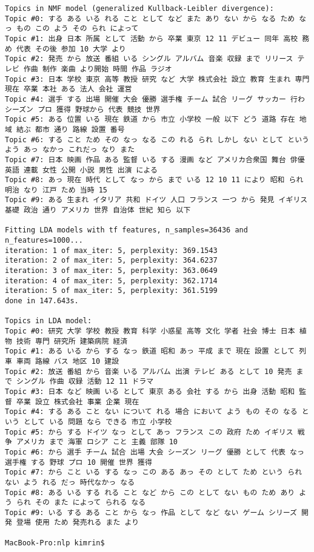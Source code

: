 \documentclass[uplatex]{jsarticle}
\begin{document}
\begin{verbatim}
Topics in NMF model (generalized Kullback-Leibler divergence):
Topic #0: する ある いる れる こと として など また あり ない から なる ため なっ もの この よう その られ によって
Topic #1: 出身 日本 所属 として 活動 から 卒業 東京 12 11 デビュー 同年 高校 務め 代表 その後 参加 10 大学 より
Topic #2: 発売 から 放送 番組 いる シングル アルバム 音楽 収録 まで リリース テレビ 作曲 制作 楽曲 より開始 時間 作品 ラジオ
Topic #3: 日本 学校 東京 高等 教授 研究 など 大学 株式会社 設立 教育 生まれ 専門 現在 卒業 本社 ある 法人 会社 運営
Topic #4: 選手 する 出場 開催 大会 優勝 選手権 チーム 試合 リーグ サッカー 行わ シーズン プロ 獲得 野球から 代表 競技 世界
Topic #5: ある 位置 いる 現在 鉄道 から 市立 小学校 一般 以下 どう 道路 存在 地域 結ぶ 都市 通り 路線 設置 番号
Topic #6: する こと ため その なっ なる この れる られ しかし ない として という よう あっ なかっ これだっ なり また
Topic #7: 日本 映画 作品 ある 監督 いる する 漫画 など アメリカ合衆国 舞台 俳優 英語 連載 女性 公開 小説 男性 出演 による
Topic #8: あっ 現在 時代 として なっ から まで いる 12 10 11 により 昭和 られ 明治 なり 江戸 ため 当時 15
Topic #9: ある 生まれ イタリア 共和 ドイツ 人口 フランス 一つ から 発見 イギリス 基礎 政治 通り アメリカ 世界 自治体 世紀 知ら 以下

Fitting LDA models with tf features, n_samples=36436 and n_features=1000...
iteration: 1 of max_iter: 5, perplexity: 369.1543
iteration: 2 of max_iter: 5, perplexity: 364.6237
iteration: 3 of max_iter: 5, perplexity: 363.0649
iteration: 4 of max_iter: 5, perplexity: 362.1714
iteration: 5 of max_iter: 5, perplexity: 361.5199
done in 147.643s.

Topics in LDA model:
Topic #0: 研究 大学 学校 教授 教育 科学 小惑星 高等 文化 学者 社会 博士 日本 植物 技術 専門 研究所 建築病院 経済
Topic #1: ある いる から する なっ 鉄道 昭和 あっ 平成 まで 現在 設置 として 列車 車両 路線 バス 地区 10 建設
Topic #2: 放送 番組 から 音楽 いる アルバム 出演 テレビ ある として 10 発売 まで シングル 作曲 収録 活動 12 11 ドラマ
Topic #3: 日本 など 映画 いる として 東京 ある 会社 する から 出身 活動 昭和 監督 卒業 設立 株式会社 事業 企業 現在
Topic #4: する ある こと ない について れる 場合 において よう もの その なる という として いる 問題 なら できる 市立 小学校
Topic #5: から する ドイツ なっ として あっ フランス この 政府 ため イギリス 戦争 アメリカ まで 海軍 ロシア こと 主義 部隊 10
Topic #6: から 選手 チーム 試合 出場 大会 シーズン リーグ 優勝 として 代表 なっ 選手権 する 野球 プロ 10 開催 世界 獲得
Topic #7: から こと いる する なっ この ある あっ その として ため という られ ない よう れる だっ 時代なかっ なる
Topic #8: ある いる する れる こと など から この として ない もの ため あり よう られ その また によって られる なる
Topic #9: いる する ある こと から なっ 作品 として など ない ゲーム シリーズ 開発 登場 使用 ため 発売れる また より

MacBook-Pro:nlp kimrin$
\end{verbatim}
\end{document}
